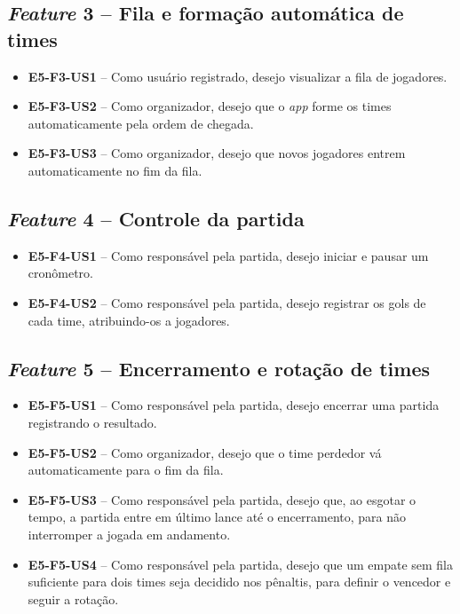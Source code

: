\begin{apendicesenv}
    \subsection*{\textit{Feature} 3 -- Fila e formação automática de times}
    \begin{itemize}
        \item \textbf{E5-F3-US1} -- Como usuário registrado, desejo visualizar a fila de jogadores.
        \item \textbf{E5-F3-US2} -- Como organizador, desejo que o \textit{app} forme os times automaticamente pela ordem de chegada.
        \item \textbf{E5-F3-US3} -- Como organizador, desejo que novos jogadores entrem automaticamente no fim da fila.
    \end{itemize}

    \subsection*{\textit{Feature} 4 -- Controle da partida}
    \begin{itemize}
        \item \textbf{E5-F4-US1} -- Como responsável pela partida, desejo iniciar e pausar um cronômetro.
        \item \textbf{E5-F4-US2} -- Como responsável pela partida, desejo registrar os gols de cada time, atribuindo-os a jogadores.
    \end{itemize}

    \subsection*{\textit{Feature} 5 -- Encerramento e rotação de times}
    \begin{itemize}
        \item \textbf{E5-F5-US1} -- Como responsável pela partida, desejo encerrar uma partida registrando o resultado.
        \item \textbf{E5-F5-US2} -- Como organizador, desejo que o time perdedor vá automaticamente para o fim da fila.
        \item \textbf{E5-F5-US3} -- Como responsável pela partida, desejo que, ao esgotar o tempo, a partida entre em último lance até o encerramento, para não interromper a jogada em andamento.
        \item \textbf{E5-F5-US4} -- Como responsável pela partida, desejo que um empate sem fila suficiente para dois times seja decidido nos pênaltis, para definir o vencedor e seguir a rotação.
    \end{itemize}


\end{apendicesenv}
